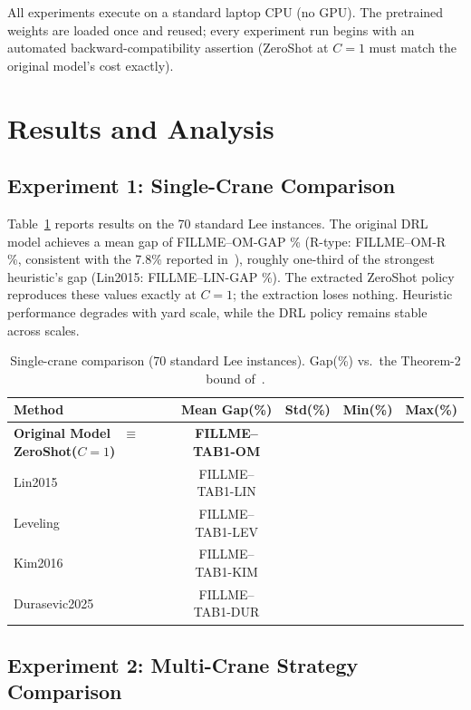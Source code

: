 \documentclass[11pt,a4paper]{elsarticle}
\begin{document}
All experiments execute on a standard laptop CPU (no GPU). The pretrained weights are loaded once and reused; every experiment run begins with an automated backward-compatibility assertion (ZeroShot at $C=1$ must match the original model's cost exactly).

\section{Results and Analysis}
\label{sec:results}

\subsection{Experiment 1: Single-Crane Comparison}
\label{sec:exp1}

Table~\ref{tab:single} reports results on the 70 standard Lee instances. The original DRL model achieves a mean gap of FILLME--OM-GAP
\% (R-type: FILLME--OM-R
\%, consistent with the 7.8\% reported in~\cite{shin2026}), roughly one-third of the strongest heuristic's gap (Lin2015: FILLME--LIN-GAP
\%). The extracted ZeroShot policy reproduces these values exactly at $C=1$; the extraction loses nothing. Heuristic performance degrades with yard scale, while the DRL policy remains stable across scales.

\begin{table}[h!]
    \centering
    \caption{Single-crane comparison (70 standard Lee instances). Gap(\%) vs.\ the Theorem-2 bound of~\cite{shin2026}.}
    \label{tab:single}
    \begin{tabularx}{\textwidth}{lcccc}
        \toprule
        Method & Mean Gap(\%) & Std(\%) & Min(\%) & Max(\%) \\
        \midrule
        \textbf{Original Model~\cite{shin2026} $\equiv$ ZeroShot($C{=}1$)} & \textbf{FILLME--TAB1-OM}
 & & & \\
        Lin2015~\cite{lin2015} & FILLME--TAB1-LIN
 & & & \\
        Leveling~\cite{zehendner2017} & FILLME--TAB1-LEV
 & & & \\
        Kim2016~\cite{kim2016} & FILLME--TAB1-KIM
 & & & \\
        Durasevic2025~\cite{durasevic2025} & FILLME--TAB1-DUR
 & & & \\
        \bottomrule
    \end{tabularx}
\end{table}

\subsection{Experiment 2: Multi-Crane Strategy Comparison}
\end{document}
